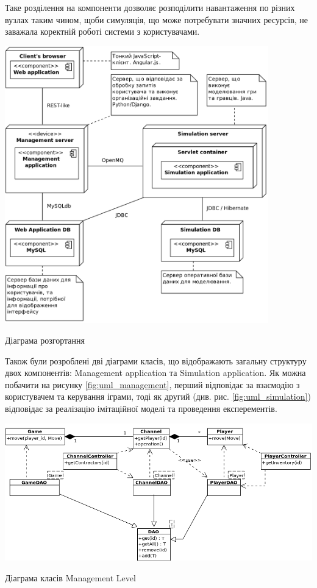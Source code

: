 Таке розділення на компоненти дозволяє розподілити навантаження по різних вузлах таким чином, щоби симуляція, що може потребувати значних ресурсів, не заважала коректній роботі системи з користувачами.
\begin{stdfigure}
    \includegraphics[width=4.5in]{images/uml/component_diagram.png}
    \caption{Діаграма розгортання}
    \label{fig:uml_components}
\end{stdfigure}   

Також були розроблені дві діаграми класів, що відображають загальну структуру двох компонентів: Management application та Simulation application. Як можна побачити на рисунку \ref{fig:uml_management}, перший відповідає за взаємодію з користувачем та керування іграми, тоді як другий (див. рис. \ref{fig:uml_simulation}) відповідає за реалізацію імітаційної моделі та проведення експерементів.

\begin{stdfigure}
    \includegraphics[width=7in]{images/uml/management_level.png}
    \caption{Діаграма класів Management Level}
    \label{fig:uml_management}
\end{stdfigure}   


